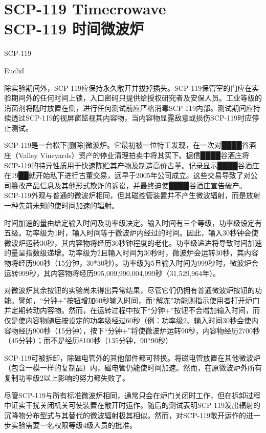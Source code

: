 \chapter[SCP-119 时间微波炉]{
    SCP-119 Timecrowave\\
    SCP-119 时间微波炉
}

\label{chap:SCP-119}

SCP-119

Euclid

除实验期间外，SCP-119应保持永久敞开并拔掉插头。SCP-119保管室的门应在实验期间外的任何时间上锁，入口密码只提供给授权研究者及安保人员。工业等级的消菌剂将随时放置在侧，进行任何测试前应严格消毒SCP-119内部。测试期间应持续透过SCP-119的视屏窗监视其内容物，当内容物显露敌意或损伤SCP-119时应停止测试。

SCP-119是一台松下{[}删除]微波炉。它最初被一位特工发现，在一次对████谷酒庄（Valley Vineyards）资产的停业清理拍卖中将其买下。据信████谷酒庄将SCP-119的特异性质用于快速陈贮其产物及制造高价古董。记录显示████谷酒庄在19██就开始私下进行古董交易，远早于2005年公司成立。这些交易导致了对公司篡改产品信息及其他形式欺诈的诉讼，并最终迫使████谷酒庄宣告破产。SCP-119外观与普通的微波炉相同，但其磁控管装置并不产生微波辐射，而是放射一种先前未知的使时间加速的辐射。

时间加速的量由给定输入时间及功率级决定。输入时间有三个等级，功率级设定有五级。功率级为1时，输入时间等于微波炉内经过的时间。因此，输入30秒钟会使微波炉运转30秒，其内容物将经历30秒钟程度的老化。功率级递进将导致时间加速的量呈指数级递增。功率级为2且输入时间为30秒时，微波炉会运转30秒，其内容物将经历900秒（15分钟，30*30秒）。功率级为5且输入时间为999秒时，微波炉会运转999秒，其内容物将经历995,009,990,004,999秒（31,529,964年）。

对微波炉其余按钮的实验尚未得出异常结果，尽管它们仍拥有普通微波炉按钮的功能。譬如，“分钟+”按钮增加60秒输入时间，而“解冻”功能则指示使用者打开炉门并定期转动内容物。然而，在运转过程中按下“分钟+”按钮不会增加输入时间，而仅是使内容物随后按设定的功率级经过60秒（例：功率级2、输入时间30秒会使内容物经历900秒（15分钟），按下“分钟+”将使微波炉运转90秒，内容物经历2700秒（45分钟）；而不是经历8100秒（135分钟，90*90秒）

SCP-119可被拆卸，除磁电管外的其他部件都可替换。将磁电管放置在其他微波炉（包含一模一样的复制品）内，磁电管仍能使时间加速。然而，在原微波炉外所有复制功率级2以上影响的努力都失败了。

尽管SCP-119与所有标准微波炉相同，通常只会在炉门关闭时工作，但在拆卸过程中证实干扰关闭机关可使装置在敞开时运作。随后的测试表明SCP-119发出辐射的沉降物分布型式与其替代的微波辐射极其相似。然而，对SCP-119敞开运作的进一步实验需要一名权限等级4级人员的批准。

